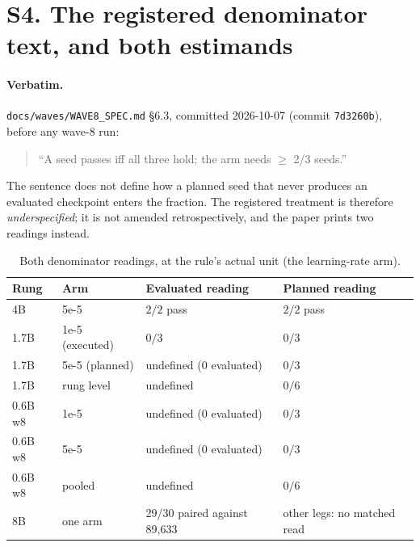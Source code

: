 \documentclass[11pt,a4paper]{article}
\begin{document}
\section{S4. The registered denominator text, and both estimands}

\paragraph{Verbatim.} \texttt{docs/waves/WAVE8\_SPEC.md} \S6.3, committed 2026-10-07 (commit
\texttt{7d3260b}), before any wave-8 run:

\begin{quote}
``A seed passes iff all three hold; the arm needs $\geq$ 2/3 seeds.''
\end{quote}

\noindent The sentence does not define how a planned seed that never produces an evaluated
checkpoint enters the fraction. The registered treatment is therefore \emph{underspecified}; it is
not amended retrospectively, and the paper prints two readings instead.

\begin{table}[h]
\centering
\small
\caption{Both denominator readings, at the rule's actual unit (the learning-rate arm).}
\label{tab:s4}
\begin{tabular}{@{}p{2.4cm}p{2.3cm}p{3.4cm}p{4.0cm}@{}}
\toprule
\textbf{Rung} & \textbf{Arm} & \textbf{Evaluated reading} & \textbf{Planned reading} \\
\midrule
4B & 5e-5 & $2/2$ pass & $2/2$ pass \\
1.7B & 1e-5 (executed) & $0/3$ & $0/3$ \\
1.7B & 5e-5 (planned) & undefined (0 evaluated) & $0/3$ \\
1.7B & rung level & undefined & $0/6$ \\
0.6B w8 & 1e-5 & undefined (0 evaluated) & $0/3$ \\
0.6B w8 & 5e-5 & undefined (0 evaluated) & $0/3$ \\
0.6B w8 & pooled & undefined & $0/6$ \\
8B & one arm & 29/30 paired against 89{,}633 & other legs: no matched read \\
\bottomrule
\end{tabular}
\end{table}
\end{document}
